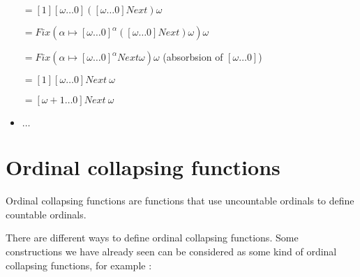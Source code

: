 \documentclass[10pt]{article}
\begin{document}
\begin{itemize}
\( = [1] [\omega \ldots 0] ([\omega \ldots 0] Next) \omega \) 

\( = Fix (\alpha \mapsto [\omega \ldots 0]^\alpha ([\omega \ldots 0] Next) \omega) \omega \)

\( = Fix (\alpha \mapsto [\omega \ldots 0]^\alpha Next \omega) \omega \) (absorbsion of \( [\omega \ldots 0] \)) 

\( = [1] [\omega \ldots 0] Next\ \omega \) 

\( = [\omega+1 \ldots 0] Next\ \omega \)



\item \( \ldots \)

\end{itemize}



\section{Ordinal collapsing functions}

\begin{comment}
Remember that collapsing consists in using uncountable ordinals to define countable ordinals. 

We already saw how collapsing can be used to define ordinals, for example :
\end{comment}

Ordinal collapsing functions are functions that use uncountable ordinals to define countable ordinals.

There are different ways to define ordinal collapsing functions. Some constructions we have already seen can be considered as some kind of ordinal collapsing functions, for example :
\end{document}
